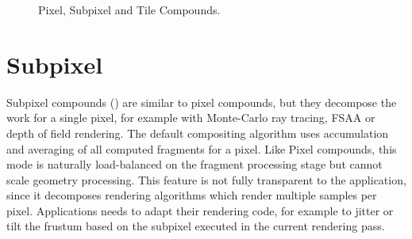 \begin{figure}[t]\center
  \hfil
  \hfil
  \caption{Pixel, Subpixel and Tile Compounds.}
\end{figure}

\section{Subpixel}

Subpixel compounds () are similar to pixel compounds, but they
decompose the work for a single pixel, for example with Monte-Carlo ray
tracing, FSAA or depth of field rendering. The default compositing algorithm
uses accumulation and averaging of all computed fragments for a pixel. Like
Pixel compounds, this mode is naturally load-balanced on the fragment
processing stage but cannot scale geometry processing. This feature is not
fully transparent to the application, since it decomposes rendering algorithms
which render multiple samples per pixel. Applications needs to adapt their
rendering code, for example to jitter or tilt the frustum based on the subpixel
executed in the current rendering pass.

